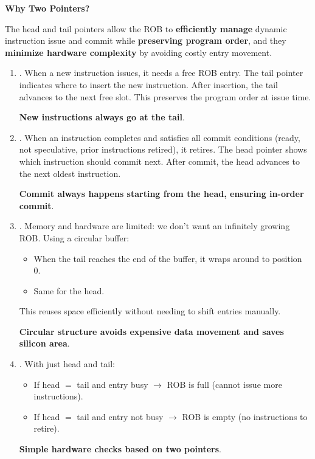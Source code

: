 \highspace
\begin{flushleft}
    \textcolor{Green3}{ \textbf{Why Two Pointers?}}
\end{flushleft}
The head and tail pointers allow the ROB to \textbf{efficiently manage} dynamic instruction issue and commit while \textbf{preserving program order}, and they \textbf{minimize hardware complexity} by avoiding costly entry movement.
\begin{enumerate}
    \item {}. When a new instruction issues, it needs a free ROB entry. The tail pointer indicates where to insert the new instruction. After insertion, the tail advances to the next free slot. This preserves the program order at issue time.

    \textbf{New instructions always go at the tail}.


    \item {}.  When an instruction completes and satisfies all commit conditions (ready, not speculative, prior instructions retired), it retires. The head pointer shows which instruction should commit next. After commit, the head advances to the next oldest instruction.
    
    \textbf{Commit always happens starting from the head, ensuring in-order commit}.
    

    \newpage
    
    
    \item {}.  Memory and hardware are limited: we don't want an infinitely growing ROB. Using a circular buffer:
    \begin{itemize}
        \item When the tail reaches the end of the buffer, it wraps around to position 0.
        \item Same for the head.
    \end{itemize}
    This reuses space efficiently without needing to shift entries manually.
    
    \textbf{Circular structure avoids expensive data movement and saves silicon area}.
    
    
    \item {}. With just head and tail:
    \begin{itemize}
        \item If head $=$ tail and entry busy $\rightarrow$ ROB is full (cannot issue more instructions).
        \item If head $=$ tail and entry not busy $\rightarrow$ ROB is empty (no instructions to retire).
    \end{itemize}
    
    \textbf{Simple hardware checks based on two pointers}.
\end{enumerate}

